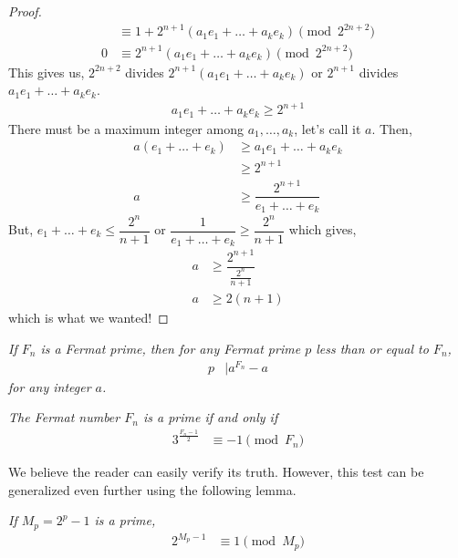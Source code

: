 \documentclass{subfile}
\begin{document}
\begin{proof}
\begin{align*}
											  &\equiv1+2^{n+1}(a_1e_1+\ldots+a_ke_k)\pmod{2^{2n+2}}\\
											 0&\equiv2^{n+1}(a_1e_1+\ldots+a_ke_k)\pmod{2^{2n+2}}
				\end{align*}
			This gives us, $2^{2n+2}$ divides $2^{n+1}(a_1e_1+\ldots+a_ke_k)$ or $2^{n+1}$ divides $a_1e_1+\ldots+a_ke_k$.
				\begin{align*}
					a_1e_1+\ldots+a_ke_k\geq2^{n+1}
				\end{align*}
			There must be a maximum integer among $a_1,\ldots,a_k$, let's call it $a$. Then,
				\begin{align*}
					a(e_1+\ldots+e_k) & \geq a_1e_1+\ldots+a_ke_k\\
									  & \geq 2^{n+1}\\
									 a&\geq\dfrac{2^{n+1}}{e_1+\ldots+e_k}
				\end{align*}
			But, $e_1+\ldots+e_k\leq\dfrac{2^n}{n+1}$ or $\dfrac{1}{e_1+\ldots+e_k}\geq\dfrac{2^n}{n+1}$ which gives,
				\begin{align*}
					a & \geq \dfrac{2^{n+1}}{\frac{2^n}{n+1}}\\
					a & \geq 2(n+1)
				\end{align*}
			which is what we wanted!
			
		\end{proof}
		
		\begin{theorem}\slshape
			If $F_n$ is a Fermat prime, then for any Fermat prime $p$ less than or equal to $F_n$,
				\begin{align*}
					p & | a^{F_n}-a
				\end{align*}
			for any integer $a$.
		\end{theorem}
		
		\begin{theorem}\slshape
			The Fermat number $F_n$ is a prime if and only if
				\begin{align*}
					3^{\frac{F_n-1}{2}} &\equiv-1\pmod{F_n}
				\end{align*}
		\end{theorem}
	We believe the reader can easily verify its truth. However, this test can be generalized even further using the following lemma.
		\begin{lemma}\slshape
			If $M_p=2^p-1$ is a prime, 
				\begin{align*}
					2^{M_p-1} &\equiv1\pmod{M_p}
				\end{align*}
		\end{lemma}
		
\end{document}
